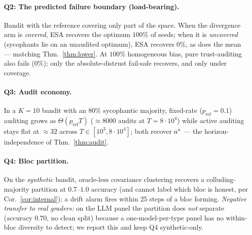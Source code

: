 \documentclass[11pt]{article}
\theoremstyle{definition}\newtheorem{definition}{Definition}
\theoremstyle{definition}\newtheorem{assumption}{Assumption}
\begin{document}
\paragraph{Q2: The predicted failure boundary (load-bearing).} Bandit with the reference covering only
part of the space. When the divergence arm is \emph{covered}, ESA recovers the optimum $100\%$ of
seeds; when it is \emph{uncovered} (sycophants lie on an unaudited optimum), ESA recovers $0\%$, as
does the mean --- matching Thm.~\ref{thm:lower}. At $100\%$ homogeneous bias, pure trust-auditing also
fails ($0\%$); only the absolute-distrust fail-safe recovers, and only under coverage.

\paragraph{Q3: Audit economy.} In a $K{=}10$ bandit with an 80\% sycophantic majority, fixed-rate
($p_{\mathrm{ref}}=0.1$) auditing grows as $\Theta(p_{\mathrm{ref}}T)$ ($\approx 8000$ audits at
$T=8{\cdot}10^4$) while active auditing stays flat at $\approx 32$ across $T\in[10^3,8{\cdot}10^4]$;
both recover $a^{\ast}$ --- the horizon-independence of Thm.~\ref{thm:audit}.

\paragraph{Q4: Bloc partition.} On the \emph{synthetic} bandit, oracle-less covariance clustering
recovers a colluding-majority partition at $0.7$--$1.0$ accuracy (and cannot label which bloc is
honest, per Cor.~\ref{cor:internal}); a drift alarm fires within 25 steps of a bloc forming.
\emph{Negative transfer to real graders:} on the LLM panel the partition does \emph{not} separate
(accuracy $0.70$, no clean split) because a one-model-per-type panel has no within-bloc diversity to
detect; we report this and keep Q4 synthetic-only.
\end{document}
